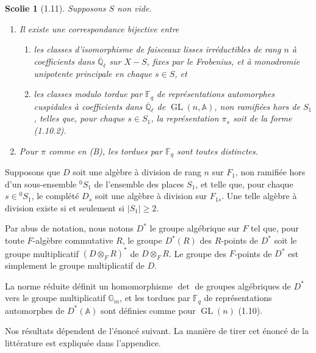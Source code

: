 \documentclass[10pt]{article}
\newcommand{\Fq}{\mathbb F_q}
\newcommand{\Ql}{\overline{\mathbb Q}_{\ell}}
\newcommand{\Adele}{\mathbb A}
\newcommand{\Gm}{\mathbb G_m}
\newcommand{\GL}{\operatorname{GL}}
\newcommand{\detm}{\operatorname{det}}
\theoremstyle{deligne}
\newtheorem*{scholium*}{Scolie}
\newcommand{\heading}[1]{\vspace{0.7em}\noindent{\bfseries #1}\quad}
\begin{document}
\begin{scholium*}[1.11]
Supposons $S$ non vide.
\begin{enumerate}[label=(\roman*)]
\item Il existe une correspondance bijective entre
\begin{enumerate}[label=(\Alph*)]
\item les classes d'isomorphisme de faisceaux lisses irréductibles de rang $n$ à coefficients dans $\Ql$ sur $X-S$, fixes par le Frobenius, et à monodromie unipotente principale en chaque $s\in S$, et
\item les classes modulo tordue par $\Fq$ de représentations automorphes cuspidales à coefficients dans $\Ql$ de $\GL(n,\Adele)$, non ramifiées hors de $S_1$, telles que, pour chaque $s\in S_1$, la représentation $\pi_s$ soit de la forme (1.10.2).
\end{enumerate}
\item Pour $\pi$ comme en (B), les tordues par $\Fq$ sont toutes distinctes.
\end{enumerate}
\end{scholium*}

\heading{1.12.} Supposons que $D$ soit une algèbre à division de rang $n$ sur $F_1$, non ramifiée hors d'un sous-ensemble ${}^0S_1$ de l'ensemble des places $S_1$, et telle que, pour chaque $s\in{}^0S_1$, le complété $D_s$ soit une algèbre à division sur $F_{1s}$. Une telle algèbre à division existe si et seulement si $|S_1|\ge2$.

Par abus de notation, nous notons $D^*$ le groupe algébrique sur $F$ tel que, pour toute $F$-algèbre commutative $R$, le groupe $D^*(R)$ des $R$-points de $D^*$ soit le groupe multiplicatif $(D\otimes_F R)^*$ de $D\otimes_F R$. Le groupe des $F$-points de $D^*$ est simplement le groupe multiplicatif de $D$.

La norme réduite définit un homomorphisme $\detm$ de groupes algébriques de $D^*$ vers le groupe multiplicatif $\Gm$, et les tordues par $\Fq$ de représentations automorphes de $D^*(\Adele)$ sont définies comme pour $\GL(n)$ (1.10).

Nos résultats dépendent de l'énoncé suivant. La manière de tirer cet énoncé de la littérature est expliquée dans l'appendice.
\end{document}
